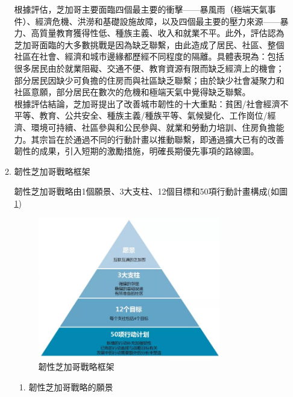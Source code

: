 \documentclass[a4paper,12pt]{article}
\begin{document}
\begin{enumerate}
\begin{enumerate}
根據評估，芝加哥主要面臨四個最主要的衝擊——暴風雨（極端天氣事件）、經濟危機、洪澇和基礎設施故障，以及四個最主要的壓力來源——暴力、高質量教育獲得性低、種族主義、收入和就業不平。此外，評估認為芝加哥面臨的大多數挑戰是因為缺乏聯繫，由此造成了居民、社區、整個社區在社會、經濟和城市邊緣都歷經不同程度的隔離。具體表現為：包括很多居民由於就業阻礙、交通不便、教育資源有限而缺乏經濟上的機會；部分居民因缺少可負擔的住房而與社區缺乏聯繫；由於缺少社會凝聚力和社區意願，部分居民在數次的危機和極端天氣中覺得缺乏聯繫。\\

根據評估結論，芝加哥提出了改善城市韌性的十大重點：貧困/社會經濟不平等、教育、公共安全、種族主義/種族平等、氣候變化、工作崗位/經濟、環境可持續、社區參與和公民參與、就業和勞動力培訓、住房負擔能力。其宗旨在於通過不同的行動計畫以推動聯繫，即通過擴大已有的改善韌性的成果，引入短期的激勵措施，明確長期優先事項的路線圖。\\

\item 韌性芝加哥戰略框架
\label{sec:orge43323f}

韌性芝加哥戰略由1個願景、3大支柱、12個目標和50項行動計畫構成(如圖\ref{fig:Chicago-1})\\

\begin{figure}[htbp]
\centering
\includegraphics[width=300]{images/2021-03-24_15-12-51.jpg}
\caption{\label{fig:Chicago-1}韌性芝加哥戰略框架}
\end{figure}

\begin{enumerate}
\item 韌性芝加哥戰略的願景
\label{sec:org9acce95}


\end{enumerate}
\end{enumerate}
\end{enumerate}
\end{document}
